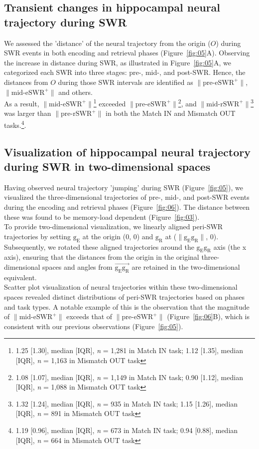 \documentclass[final,3p,times,twocolumn]{elsarticle}
\begin{document}
\subsection{Transient changes in hippocampal neural trajectory during SWR}
We assessed the 'distance' of the neural trajectory from the origin ($O$) during SWR events in both encoding and retrieval phases (Figure~\ref{fig:05}A). Observing the increase in distance during SWR, as illustrated in Figure~\ref{fig:05}A, we categorized each SWR into three stages: pre-, mid-, and post-SWR. Hence, the distances from $O$ during those SWR intervals are identified as $\mathrm{\lVert \text{pre-eSWR}^+ \rVert}$, $\mathrm{\lVert \text{mid-eSWR}^+ \rVert}$ and others.
\\
\indent
As a result, $\mathrm{\lVert \text{mid-eSWR}^+ \rVert}$\footnote{1.25 [1.30], median [IQR], \textit{n} = 1,281 in Match IN task; 1.12 [1.35], median [IQR], \textit{n} = 1,163 in Mismatch OUT task} exceeded $\mathrm{\lVert \text{pre-eSWR}^+ \rVert}$\footnote{1.08 [1.07], median [IQR], \textit{n} = 1,149 in Match IN task; 0.90 [1.12], median [IQR], \textit{n} = 1,088 in Mismatch OUT task}, and $\mathrm{\lVert \text{mid-rSWR}^+ \rVert}$\footnote{1.32 [1.24], median [IQR], \textit{n} = 935 in Match IN task; 1.15 [1.26], median [IQR], \textit{n} = 891 in Mismatch OUT task} was larger than $\mathrm{\lVert \text{pre-rSWR}^+ \rVert}$ in both the Match IN and Mismatch OUT tasks.\footnote{1.19 [0.96], median [IQR], \textit{n} = 673 in Match IN task; 0.94 [0.88], median [IQR], \textit{n} = 664 in Mismatch OUT task}.

\subsection{Visualization of hippocampal neural trajectory during SWR in two-dimensional spaces}
Having observed neural trajectory 'jumping' during SWR (Figure~\ref{fig:05}), we visualized the three-dimensional trajectories of pre-, mid-, and post-SWR events during the encoding and retrieval phases (Figure~\ref{fig:06}). The distance between these was found to be memory-load dependent (Figure~\ref{fig:03}). 
\\
\indent
To provide two-dimensional visualization, we linearly aligned peri-SWR trajectories by setting $\mathrm{g_{E}}$ at the origin (0, 0) and $\mathrm{g_{R}}$ at ($\mathrm{\lVert g_{E}g_{R} \rVert}$, 0). Subsequently, we rotated these aligned trajectories around the $\mathrm{g_{E}g_{R}}$ axis (the x axis), ensuring that the distances from the origin in the original three-dimensional spaces and angles from $\overrightarrow{\mathrm{g_{E}g_{R}}}$ are retained in the two-dimensional equivalent.
\\
\indent
Scatter plot visualization of neural trajectories within these two-dimensional spaces revealed distinct distributions of peri-SWR trajectories based on phases and task types. A notable example of this is the observation that the magnitude of  $\mathrm{\lVert \text{mid-eSWR}^+ \rVert}$ exceeds that of $\mathrm{\lVert \text{pre-eSWR}^+ \rVert}$ (Figure~\ref{fig:06}B), which is consistent with our previous observations (Figure~\ref{fig:05}).
\end{document}
